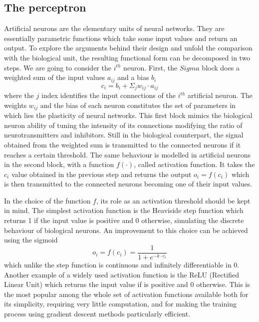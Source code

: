 \documentclass[a4paper,10pt]{report}
\begin{document}
\subsection{The perceptron}

Artificial neurons are the elementary units of neural networks.
They are essentially parametric functions which take some input values 
and return an output. To explore the arguments behind their design and unfold the
comparison with the biological unit, the resulting functional form can be decomposed
in two steps.
We are going to consider the $i^{th}$ neuron.
First, the $Sigma$ block does a weighted sum of the input values $a_{ij}$ and a bias $b_i$
\begin{equation}
   c_i = b_i + \Sigma_j w_{ij} \cdot a_{ij} 
\end{equation}
where the $j$ index identifies the input connections of the $i^{th}$ artificial neuron.
The weights $w_{ij}$ and the bias of each neuron constitutes the set of parameters in which
lies the plasticity of neural networks.
This first block mimics the biological neuron ability of tuning the intensity of its connections
modifying the ratio of neurotransmitters and inhibitors.
Still in the biological counterpart, the signal obtained from the weighted sum is transmitted to the 
connected neurons if it reaches a certain threshold.
The same behaviour is modelled in artificial neurons in the second block, 
with a function $f(\cdot)$, called activation function. It takes the $c_i$ value obtained in the
previous step and returns the output $o_i = f(c_i)$ which is then transmitted to the connected neurons 
becoming one of their input values.

In the choice of the function $f$, its role as an activation threshold should be kept in mind.
The simplest activation function is the Heaviside step function which
returns 1 if the input value is positive and 0 otherwise, simulating the discrete behaviour of 
biological neurons.
An improvement to this choice can be achieved using the sigmoid
\begin{equation}
    o_i = f(c_i) = \frac{1}{1+e^{-k\cdot c_i}}
\end{equation}
which unlike the step function is continuous and infinitely differentiable in 0.
Another example of a widely used activation function is the ReLU (Rectified Linear Unit) which returns the input value if 
is positive and 0 otherwise. This is the most popular among the whole set of activation functions available
both for its simplicity, requiring very little computation, and for making the training process using gradient
descent methods particularly efficient.
\end{document}
